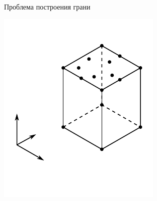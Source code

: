 \documentclass{beamer}
\begin{document}
\begin{frame}{Проблема построения грани}
    \begin{minipage}{.4\textwidth}
        \centering
        \includegraphics[width=\linewidth]{affine.pdf}
      \end{minipage}
      \begin{minipage}{.1\textwidth}
        \centering

\end{minipage}
\end{frame}
\end{document}
